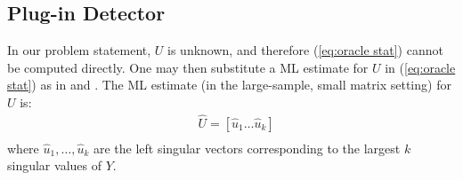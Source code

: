 
\subsection{Plug-in Detector}

In our problem statement, $U$ is unknown, and therefore (\ref{eq:oracle stat}) cannot be computed directly. One may then substitute a ML estimate for $U$ in (\ref{eq:oracle stat}) as in \cite{jin2005cfar} and \cite{mcwhorter2003matched}. The ML estimate (in the large-sample, small matrix setting) for $U$ is:
\begin{equation}\label{eq:param estims}
\begin{aligned}
&\widehat{U}=[\widehat{u}_1 \dots \widehat{u}_{k}]\\
\end{aligned}
\end{equation}
where $\widehat{u}_1,\dots,\widehat{u}_{k}$ are the left singular vectors corresponding to the largest $k$ singular values of $Y$.

